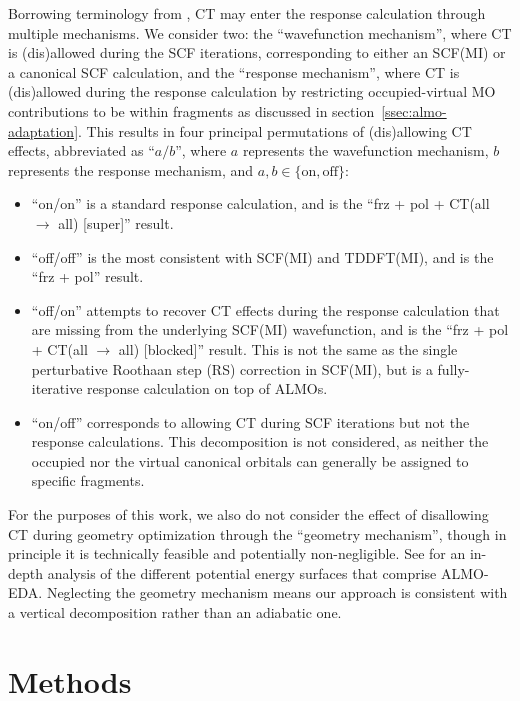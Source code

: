 Borrowing terminology from , CT may enter the response calculation through multiple mechanisms. We consider two: the ``wavefunction mechanism'', where CT is (dis)allowed during the SCF iterations, corresponding to either an SCF(MI) or a canonical SCF calculation, and the ``response mechanism'', where CT is (dis)allowed during the response calculation by restricting occupied-virtual MO contributions to be within fragments as discussed in section~\ref{ssec:almo-adaptation}. This results in four principal permutations of (dis)allowing CT effects, abbreviated as ``\(a/b\)'', where \(a\) represents the wavefunction mechanism, \(b\) represents the response mechanism, and \(a,b\in\{\text{on},\text{off}\}\):

\begin{itemize}
\item ``on/on'' is a standard response calculation, and is the ``frz + pol + CT(all \(\rightarrow\) all) [super]'' result.
\item ``off/off'' is the most consistent with SCF(MI) and TDDFT(MI), and is the ``frz + pol'' result.
\item ``off/on'' attempts to recover CT effects during the response calculation that are missing from the underlying SCF(MI) wavefunction, and is the ``frz + pol + CT(all \(\rightarrow\) all) [blocked]'' result. This is not the same as the single perturbative Roothaan step (RS) correction in SCF(MI), but is a fully-iterative response calculation on top of ALMOs.
\item ``on/off'' corresponds to allowing CT during SCF iterations but not the response calculations. This decomposition is not considered, as neither the occupied nor the virtual canonical orbitals can generally be assigned to specific fragments.
\end{itemize}

For the purposes of this work, we also do not consider the effect of disallowing CT during geometry optimization through the ``geometry mechanism'', though in principle it is technically feasible and potentially non-negligible. See  for an in-depth analysis of the different potential energy surfaces that comprise ALMO-EDA. Neglecting the geometry mechanism means our approach is consistent with a vertical decomposition rather than an adiabatic one.

\section{Methods}
\label{sec:methods}

